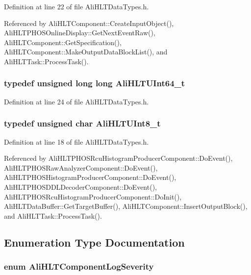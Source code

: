 Definition at line 22 of file Ali\-HLTData\-Types.h.

Referenced by Ali\-HLTComponent::Create\-Input\-Object(), Ali\-HLTPHOSOnline\-Display::Get\-Next\-Event\-Raw(), Ali\-HLTComponent::Get\-Specification(), Ali\-HLTComponent::Make\-Output\-Data\-Block\-List(), and Ali\-HLTTask::Process\-Task().
\subsubsection{\setlength{\rightskip}{0pt plus 5cm}typedef unsigned long long {\bf Ali\-HLTUInt64\_\-t}}\label{AliHLTDataTypes_8h_a7}




Definition at line 24 of file Ali\-HLTData\-Types.h.
\subsubsection{\setlength{\rightskip}{0pt plus 5cm}typedef unsigned char {\bf Ali\-HLTUInt8\_\-t}}\label{AliHLTDataTypes_8h_a4}




Definition at line 18 of file Ali\-HLTData\-Types.h.

Referenced by Ali\-HLTPHOSRcu\-Histogram\-Producer\-Component::Do\-Event(), Ali\-HLTPHOSRaw\-Analyzer\-Component::Do\-Event(), Ali\-HLTPHOSHistogram\-Producer\-Component::Do\-Event(), Ali\-HLTPHOSDDLDecoder\-Component::Do\-Event(), Ali\-HLTPHOSRcu\-Histogram\-Producer\-Component::Do\-Init(), Ali\-HLTData\-Buffer::Get\-Target\-Buffer(), Ali\-HLTComponent::Insert\-Output\-Block(), and Ali\-HLTTask::Process\-Task().

\subsection{Enumeration Type Documentation}
\subsubsection{\setlength{\rightskip}{0pt plus 5cm}enum {\bf Ali\-HLTComponent\-Log\-Severity}}\label{AliHLTDataTypes_8h_a29}


